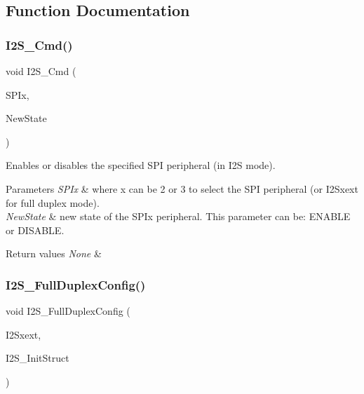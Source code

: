\subsection{Function Documentation}
\mbox{\label{group___s_p_i___group1_gafe061c71bbc5b4224f3f2884dc53739e}} 
\subsubsection{\texorpdfstring{I2\+S\+\_\+\+Cmd()}{I2S\_Cmd()}}
{\footnotesize\ttfamily void I2\+S\+\_\+\+Cmd (\begin{DoxyParamCaption}\item[{S\+P\+I\+\_\+\+Type\+Def $\ast$}]{S\+P\+Ix,  }\item[{Functional\+State}]{New\+State }\end{DoxyParamCaption})}



Enables or disables the specified S\+PI peripheral (in I2S mode). 


\begin{DoxyParams}{Parameters}
{\em S\+P\+Ix} & where x can be 2 or 3 to select the S\+PI peripheral (or I2\+Sxext for full duplex mode). \\
\hline
{\em New\+State} & new state of the S\+P\+Ix peripheral. This parameter can be\+: E\+N\+A\+B\+LE or D\+I\+S\+A\+B\+LE. \\
\hline
\end{DoxyParams}

\begin{DoxyRetVals}{Return values}
{\em None} & \\
\hline
\end{DoxyRetVals}
\mbox{\label{group___s_p_i___group1_ga60082947bedfe9efc233405be2a7bec2}} 
\subsubsection{\texorpdfstring{I2\+S\+\_\+\+Full\+Duplex\+Config()}{I2S\_FullDuplexConfig()}}
{\footnotesize\ttfamily void I2\+S\+\_\+\+Full\+Duplex\+Config (\begin{DoxyParamCaption}\item[{S\+P\+I\+\_\+\+Type\+Def $\ast$}]{I2\+Sxext,  }\item[{\mbox{\hyperlink{struct_i2_s___init_type_def}{I2\+S\+\_\+\+Init\+Type\+Def}} $\ast$}]{I2\+S\+\_\+\+Init\+Struct }\end{DoxyParamCaption})}



